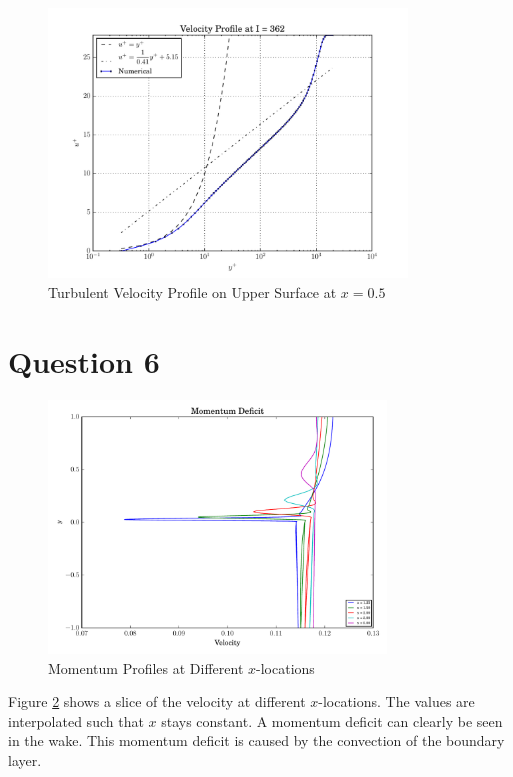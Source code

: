 \documentclass[letterpaper,12pt,]{article}
\begin{document}
\begin{figure}
    \centering
    \includegraphics[width = 0.85\textwidth]{./Figures/q5turb.pdf}
    \caption {Turbulent Velocity Profile on Upper Surface at $x=0.5$}
    \label{fig:q5turb}
\end{figure}


\section*{Question 6}
\begin{figure}[!h]
    \centering
    \includegraphics[width = 0.8\textwidth]{./Figures/q6.pdf}
    \caption {Momentum Profiles at Different $x$-locations}
    \label{fig:q6}
\end{figure}

Figure \ref{fig:q6} shows a slice of the velocity at different $x$-locations.
The values are interpolated such that $x$ stays constant.
A momentum deficit can clearly be seen in the wake.
This momentum deficit is caused by the convection of the boundary layer.
\end{document}
